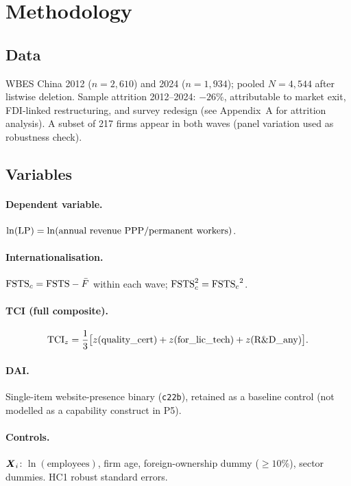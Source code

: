 \documentclass[12pt,a4paper]{article}
\begin{document}
\section{Methodology}
\label{sec:methods}

\subsection{Data}

WBES China 2012 (\(n = 2{,}610\)) and 2024 (\(n = 1{,}934\)); pooled
\(N = 4{,}544\) after listwise deletion.  Sample attrition 2012–2024:
\(-26\%\), attributable to market exit, FDI-linked restructuring, and
survey redesign (see Appendix~A for attrition analysis).  A subset of 217
firms appear in both waves (panel variation used as robustness check).

\subsection{Variables}

\paragraph{Dependent variable.}
\({\ln(\mathrm{LP})} = \ln(\text{annual revenue PPP}/\text{permanent workers})\).

\paragraph{Internationalisation.}
\({\mathrm{FSTS}_{c}} = {\mathrm{FSTS}} - \bar{F}\) within each wave; \({\mathrm{FSTS}_{c}^{2}} = {\mathrm{FSTS}_{c}}^{2}\).

\paragraph{TCI (full composite).}
\begin{equation}
  {\mathrm{TCI}_{z}} = \frac{1}{3}\bigl[z(\text{quality\_cert}) + z(\text{for\_lic\_tech})
    + z(\text{R\&D\_any})\bigr].
  \label{eq:tci_p5}
\end{equation}

\paragraph{DAI.}
Single-item website-presence binary (\texttt{c22b}), retained as a baseline
control (not modelled as a capability construct in P5).

\paragraph{Controls.}
\(\boldsymbol{X}_{i}\): \(\ln(\text{employees})\), firm age, foreign-ownership dummy
(\(\geq 10\%\)), sector dummies.  HC1 robust standard errors.
\end{document}
